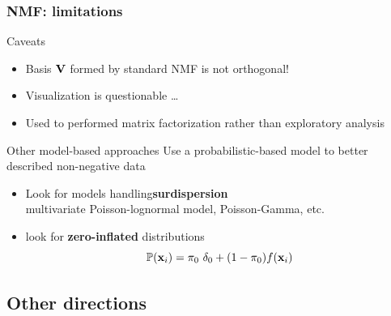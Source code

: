 \documentclass{beamer}\usepackage[]{graphicx}\usepackage[]{color}
\begin{document}
\begin{frame}
  \frametitle{NMF: limitations}

  \begin{block}{Caveats}  
    \begin{itemize}
      \item Basis $\mathbf{V}$ formed by standard NMF is not orthogonal!
      \item Visualization is questionable \dots
      \item Used to performed matrix factorization rather than exploratory analysis
    \end{itemize}
  \end{block}

  \bigskip

  \begin{block}{Other model-based approaches}
    Use a probabilistic-based model to better described non-negative data
    \begin{itemize}
      \item[\rsa] Look for models handling\alert{\bf surdispersion} \\
      {\small multivariate Poisson-lognormal model, Poisson-Gamma, etc.}
      \item[\rsa] look for \alert{\bf zero-inflated} distributions
      \[\mathbb{P}(\mathbf{x}_i) =  \pi_0 \ \delta_0 + (1-\pi_0) f(\mathbf{x}_{i})\]
    \end{itemize}
  \end{block}
  
\end{frame}



\subsection{Other directions}
\end{document}
